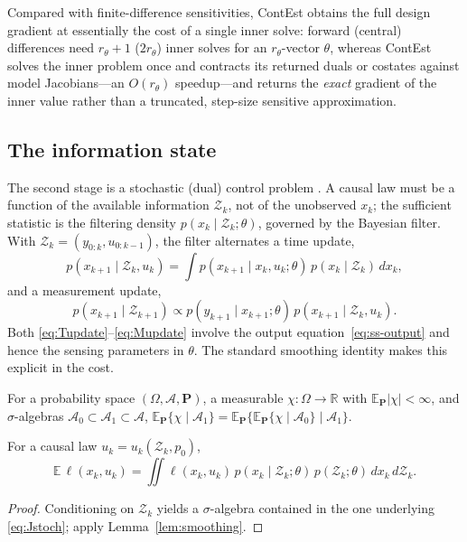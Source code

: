 \documentclass[twocolumn,amsthm]{autart}
\begin{document}
Compared with finite-difference sensitivities, ContEst obtains the full design
gradient at essentially the cost of a single inner solve: forward (central)
differences need $r_\theta+1$ ($2r_\theta$) inner solves for an $r_\theta$-vector
$\theta$, whereas ContEst solves the inner problem once and contracts its returned
duals or costates against model Jacobians---an $O(r_\theta)$ speedup---and returns
the \emph{exact} gradient of the inner value rather than a truncated, step-size
sensitive approximation.

\subsection{The information state}
The second stage is a stochastic (dual) control problem
\cite{feldbaum1960dual,bar1974dual}. A causal law must be a function of the
available information $\mathcal{Z}_k$, not of the unobserved $x_k$; the
sufficient statistic is the filtering density $p(x_k \mid \mathcal{Z}_k;\theta)$,
governed by the Bayesian filter. With $\mathcal{Z}_k = (y_{0:k}, u_{0:k-1})$, the
filter alternates a time update,
\begin{equation}\label{eq:Tupdate}
p(x_{k+1} \mid \mathcal{Z}_k, u_k) = \int p(x_{k+1} \mid x_k, u_k;\theta)\,
p(x_k \mid \mathcal{Z}_k)\, dx_k,
\end{equation}
and a measurement update,
\begin{equation}\label{eq:Mupdate}
p(x_{k+1} \mid \mathcal{Z}_{k+1}) \propto p(y_{k+1} \mid x_{k+1};\theta)\,
p(x_{k+1} \mid \mathcal{Z}_k, u_k).
\end{equation}
Both \eqref{eq:Tupdate}--\eqref{eq:Mupdate} involve the output
equation~\eqref{eq:ss-output} and hence the sensing parameters in $\theta$. The
standard smoothing identity makes this explicit in the cost.

\begin{lem}\label{lem:smoothing}
For a probability space $(\Omega,\mathcal{A},\mathbf{P})$, a measurable
$\chi:\Omega\to\mathbb{R}$ with $\mathbb{E}_{\mathbf P}|\chi|<\infty$, and
$\sigma$-algebras $\mathcal{A}_0 \subset \mathcal{A}_1 \subset \mathcal{A}$,
$\mathbb{E}_{\mathbf P}\{\chi \mid \mathcal{A}_1\} =
\mathbb{E}_{\mathbf P}\{\mathbb{E}_{\mathbf P}\{\chi \mid \mathcal{A}_0\} \mid
\mathcal{A}_1\}$.
\end{lem}

\begin{lem}\label{lem:stagecost}
For a causal law $u_k = u_k(\mathcal{Z}_k, p_0)$,
\begin{equation*}
\mathbb{E}\,\ell(x_k,u_k) = \!\iint \ell(x_k,u_k)\,
p(x_k \mid \mathcal{Z}_k;\theta)\, p(\mathcal{Z}_k;\theta)\, dx_k\, d\mathcal{Z}_k.
\end{equation*}
\end{lem}
\begin{proof}
Conditioning on $\mathcal{Z}_k$ yields a $\sigma$-algebra contained in the one
underlying \eqref{eq:Jstoch}; apply Lemma~\ref{lem:smoothing}.
\end{proof}
\end{document}
